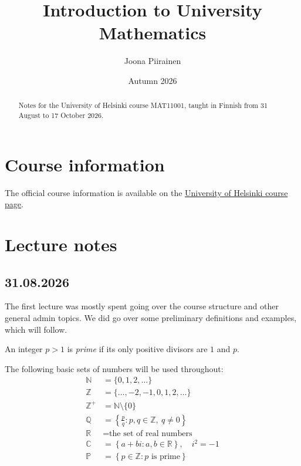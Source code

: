 \documentclass[12pt,a4paper]{article}
\title{Introduction to University Mathematics}
\author{Joona Piirainen}
\date{Autumn 2026}
\begin{document}
\maketitle

\begin{abstract}
  Notes for the University of Helsinki course MAT11001, taught in Finnish
  from 31 August to 17 October 2026.
\end{abstract}

\tableofcontents

\section{Course information}

The official course information is available on the
\href{https://studies.helsinki.fi/kurssit/toteutus/hy-opt-cur-2627-8d4269d2-7e32-4dce-bcdb-b7fa10fecac6}{University
of Helsinki course page}.

\section{Lecture notes}

\subsection{31.08.2026}

The first lecture was mostly spent going over the course structure and other
general admin topics. We did go over some preliminary definitions and examples,
which will follow.

\begin{definition}
  An integer \(p > 1\) is \emph{prime} if its only positive divisors are
  \(1\) and \(p\).
\end{definition}

\begin{definition}
  The following basic sets of numbers will be used throughout:
  \begin{align*}
    \mathbb{N} &= \{0, 1, 2, \ldots\} \\
    \mathbb{Z} &= \{\ldots, -2, -1, 0, 1, 2, \ldots\} \\
    \mathbb{Z}^{+} &= \mathbb{N} \setminus \{0\} \\
    \mathbb{Q} &= \left\{\frac{p}{q} : p,q \in \mathbb{Z},\ q \neq 0\right\} \\
    \mathbb{R} &= \text{the set of real numbers} \\
    \mathbb{C} &= \left\{a+bi : a,b \in \mathbb{R}\right\}, \quad i^2=-1 \\
    \mathbb{P} &= \left\{p \in \mathbb{Z} : p \text{ is prime}\right\}
  \end{align*}
\end{definition}
\end{document}
